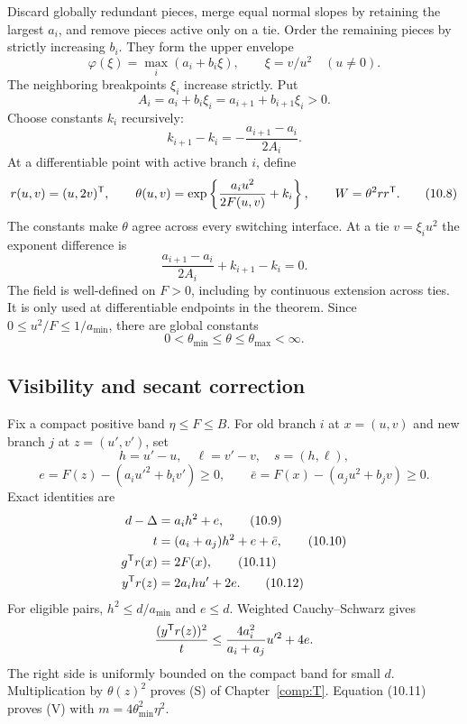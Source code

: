 Discard globally redundant pieces, merge equal normal slopes by retaining the largest $a_i$, and remove pieces active only on a tie. Order the remaining pieces by strictly increasing $b_i$. They form the upper envelope
\[
 \varphi(\xi)=\max_i(a_i+b_i\xi),\qquad \xi=v/u^2\quad(u\ne0).
\]
The neighboring breakpoints $\xi_i$ increase strictly. Put
\[
 A_i=a_i+b_i\xi_i=a_{i+1}+b_{i+1}\xi_i>0.
\]
Choose constants $k_i$ recursively:
\begin{equation}
 k_{i+1}-k_i=-\frac{a_{i+1}-a_i}{2A_i}. \tag{10.7}
\end{equation}
At a differentiable point with active branch $i$, define
\begin{equation}
 r(u,v)=(u,2v)^{\mathsf T},\qquad
 \theta(u,v)=\exp\left\{\frac{a_i u^2}{2F(u,v)}+k_i\right\},
 \qquad W=\theta^2rr^{\mathsf T}. \tag{10.8}
\end{equation}
The constants make $\theta$ agree across every switching interface. At a tie $v=\xi_i u^2$ the exponent difference is
\[
 \frac{a_{i+1}-a_i}{2A_i}+k_{i+1}-k_i=0.
\]
The field is well-defined on $F>0$, including by continuous extension across ties. It is only used at differentiable endpoints in the theorem. Since $0\le u^2/F\le1/a_{\min}$, there are global constants
\[
 0<\theta_{\min}\le\theta\le\theta_{\max}<\infty.
\]



\subsection{Visibility and secant correction}
Fix a compact positive band $\eta\le F\le B$. For old branch $i$ at $x=(u,v)$ and new branch $j$ at $z=(u',v')$, set
\[
 h=u'-u,\quad \ell=v'-v,\quad s=(h,\ell),
\]
\[
 e=F(z)-(a_i u'^2+b_i v')\ge0,\qquad
 \bar e=F(x)-(a_j u^2+b_jv)\ge0.
\]
Exact identities are
\begin{align}
 d-\Delta&=a_i h^2+e, \tag{10.9}\\
 t&=(a_i+a_j)h^2+e+\bar e, \tag{10.10}\\
 g^{\mathsf T} r(x)&=2F(x), \tag{10.11}\\
 y^{\mathsf T} r(z)&=2a_i h u'+2e. \tag{10.12}
\end{align}
For eligible pairs, $h^2\le d/a_{\min}$ and $e\le d$. Weighted Cauchy--Schwarz gives
\[
 \frac{(y^{\mathsf T} r(z))^2}{t}
 \le \frac{4a_i^2}{a_i+a_j}u'^2+4e.
\]
The right side is uniformly bounded on the compact band for small $d$. Multiplication by $\theta(z)^2$ proves (S) of Chapter~\ref{comp:T}. Equation (10.11) proves (V) with $m=4\theta_{\min}^2\eta^2$.

